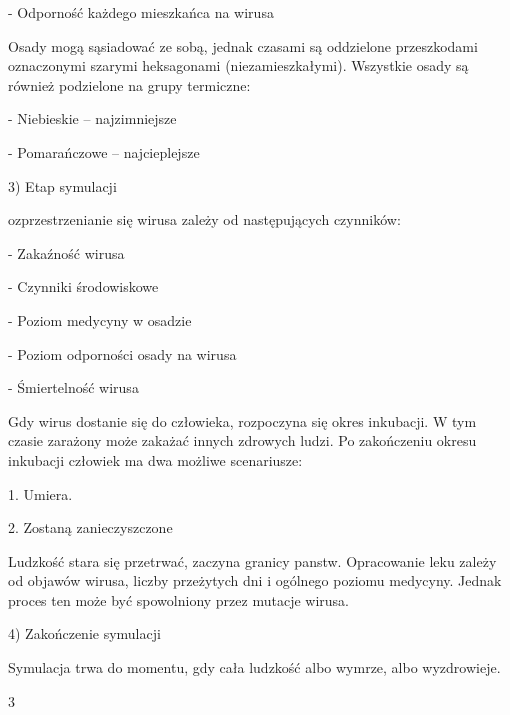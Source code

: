\documentclass[a4paper]{article}
\begin{document}
\foreignlanguage{polish}{{}- Odporność każdego mieszkańca na wirusa}


\bigskip

\foreignlanguage{polish}{Osady mogą sąsiadować ze sobą, jednak czasami są oddzielone przeszkodami oznaczonymi szarymi
heksagonami (niezamieszkałymi). Wszystkie osady są również podzielone na grupy
{\textquotedbl}termiczne{\textquotedbl}:}

\foreignlanguage{polish}{{}- Niebieskie – najzimniejsze}

\foreignlanguage{polish}{{}- Pomarańczowe – najcieplejsze}


\bigskip

\foreignlanguage{polish}{3) Etap symulacji}

\foreignlanguage{polish}{ozprzestrzenianie się wirusa zależy od następujących czynników:}

\foreignlanguage{polish}{{}- Zakaźność wirusa}

\foreignlanguage{polish}{{}- Czynniki środowiskowe}

\foreignlanguage{polish}{{}- Poziom medycyny w osadzie}

\foreignlanguage{polish}{{}- Poziom odporności osady na wirusa}

\foreignlanguage{polish}{{}- Śmiertelność wirusa}


\bigskip

\foreignlanguage{polish}{Gdy wirus dostanie się do człowieka, rozpoczyna się okres inkubacji. W tym czasie zarażony może
zakażać innych zdrowych ludzi. Po zakończeniu okresu inkubacji człowiek ma dwa możliwe scenariusze:}

\foreignlanguage{polish}{1. Umiera.}

\foreignlanguage{polish}{2. Zostaną zanieczyszczone}

\foreignlanguage{polish}{Ludzkość stara się przetrwać, zaczyna granicy panstw. Opracowanie leku zależy od objawów
wirusa, liczby przeżytych dni i ogólnego poziomu medycyny. Jednak proces ten może być spowolniony przez mutacje
wirusa.}

\foreignlanguage{polish}{4) Zakończenie symulacji}

\foreignlanguage{polish}{Symulacja trwa do momentu, gdy cała ludzkość albo wymrze, albo wyzdrowieje.}


\bigskip
\bigskip
\bigskip
\bigskip
\bigskip
\bigskip
\bigskip
\bigskip
\bigskip
\bigskip
\bigskip
\bigskip
\bigskip
\bigskip
\bigskip
\bigskip
\bigskip
\begin{center}
	3
\end{center}
\newpage
\end{document}
